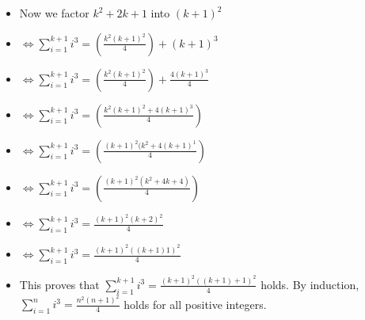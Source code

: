 \documentclass{article}
\begin{document}
\begin{enumerate}
\begin{itemize}
    \item Now we factor $k^{2}+2k+1$ into $(k+1)^{2}$
    \item [] {\Large $\Leftrightarrow \sum\limits_{i=1}^{k+1}i^{3}=\left(\frac{k^{2}(k+1)^{2}}{4} \right) + (k+1)^{3}$}
    \item [] {\Large $\Leftrightarrow \sum\limits_{i=1}^{k+1}i^{3}=\left(\frac{k^{2}(k+1)^{2}}{4} \right) + \frac{4(k+1)^{3}}{4}$}
    \item [] {\Large $\Leftrightarrow \sum\limits_{i=1}^{k+1}i^{3}=\left(\frac{k^{2}(k+1)^{2}+4(k+1)^{3}}{4} \right)$}
    \item [] {\Large $\Leftrightarrow \sum\limits_{i=1}^{k+1}i^{3}=\left(\frac{(k+1)^{2}(k^{2}+4(k+1)^{1}}{4} \right)$}
    \item [] {\Large $\Leftrightarrow \sum\limits_{i=1}^{k+1}i^{3}=\left(\frac{(k+1)^{2}(k^{2}+4k+4)}{4} \right)$}
    \item [] {\Large $\Leftrightarrow \sum\limits_{i=1}^{k+1}i^{3}=\frac{(k+1)^{2}(k+2)^{2}}{4}$}
    \item [] {\Large $\Leftrightarrow \sum\limits_{i=1}^{k+1}i^{3}=\frac{(k+1)^{2}((k+1)1)^{2}}{4}$}
    \item This proves that {\Large $\sum\limits_{i=1}^{k+1}i^{3}=\frac{(k+1)^{2}((k+1)+1)^{2}}{4}$} holds. By induction, {\Large $\sum\limits_{i=1}^{n}i^{3}=\frac{n^{2}(n+1)^{2}}{4}$} holds for all positive integers.
    \end{itemize}


\end{enumerate}
\end{document}
